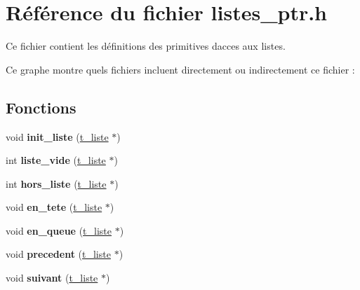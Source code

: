 \hypertarget{a00026}{}\section{Référence du fichier listes\+\_\+ptr.\+h}
\label{a00026}


Ce fichier contient les définitions des primitives d\textquotesingle{}acces aux listes.  


Ce graphe montre quels fichiers incluent directement ou indirectement ce fichier \+:
\subsection*{Fonctions}
\begin{DoxyCompactItemize}
\item 
void {\bfseries init\+\_\+liste} (\hyperlink{a00007}{t\+\_\+liste} $\ast$)\hypertarget{a00026_a0b7627ef2c1e9cb96d38a17a29577f5a}{}\label{a00026_a0b7627ef2c1e9cb96d38a17a29577f5a}

\item 
int {\bfseries liste\+\_\+vide} (\hyperlink{a00007}{t\+\_\+liste} $\ast$)\hypertarget{a00026_a65c75ddf120e39fbe7a609133d6381eb}{}\label{a00026_a65c75ddf120e39fbe7a609133d6381eb}

\item 
int {\bfseries hors\+\_\+liste} (\hyperlink{a00007}{t\+\_\+liste} $\ast$)\hypertarget{a00026_ab0752564ea5cc0cdedb92ab6c2c1a4fe}{}\label{a00026_ab0752564ea5cc0cdedb92ab6c2c1a4fe}

\item 
void {\bfseries en\+\_\+tete} (\hyperlink{a00007}{t\+\_\+liste} $\ast$)\hypertarget{a00026_a4859153f0b34828b3c94a9fa49e5d395}{}\label{a00026_a4859153f0b34828b3c94a9fa49e5d395}

\item 
void {\bfseries en\+\_\+queue} (\hyperlink{a00007}{t\+\_\+liste} $\ast$)\hypertarget{a00026_a3046dd762463c20f50c9340b336e3cd8}{}\label{a00026_a3046dd762463c20f50c9340b336e3cd8}

\item 
void {\bfseries precedent} (\hyperlink{a00007}{t\+\_\+liste} $\ast$)\hypertarget{a00026_aad7a7dd66733adc89aef2d28cb189a74}{}\label{a00026_aad7a7dd66733adc89aef2d28cb189a74}

\item 
void {\bfseries suivant} (\hyperlink{a00007}{t\+\_\+liste} $\ast$)\hypertarget{a00026_a2cb38086c4d55c7d8e8e82f74ca85eae}{}\label{a00026_a2cb38086c4d55c7d8e8e82f74ca85eae}


\end{DoxyCompactItemize}
